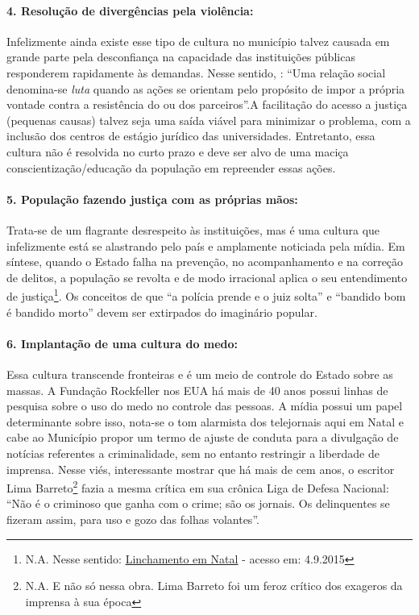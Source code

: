 \documentclass[
	12pt,				%
	openright,			%
	twoside,			%
	a4paper,			%
	chapter=TITLE,		%
	section=TITLE,		%
	subsection=TITLE,	%
	subsubsection=TITLE,%
	spanish,            %
	english,			%
	brazil				%
	]{abntex2}
\begin{document}
\paragraph*{\textbf{4. Resolução de divergências pela violência:}} Infelizmente ainda existe esse tipo de cultura no município talvez causada em grande parte pela desconfiança na capacidade das instituições públicas responderem rapidamente às demandas.  Nesse sentido, : “Uma relação social denomina-se \textit{luta} quando as ações se orientam pelo propósito de impor a própria vontade contra a resistência do ou dos parceiros”.A facilitação do acesso a justiça (pequenas causas) talvez seja uma saída viável para minimizar o problema, com a inclusão dos centros de estágio jurídico das universidades. Entretanto, essa cultura não é resolvida no curto prazo e deve ser alvo de uma maciça conscientização/educação da população em repreender essas ações.
\hypertarget{T5}{}
\paragraph*{\textbf{5. População fazendo justiça com as próprias mãos:}} Trata-se de um flagrante desrespeito às instituições, mas é uma cultura que infelizmente está se alastrando pelo país e amplamente noticiada pela mídia. Em síntese, quando o Estado falha na prevenção, no acompanhamento e na correção de delitos, a população se revolta e de modo irracional aplica o seu entendimento de justiça\footnote{N.A. Nesse sentido: \href{http://tribunadonorte.com.br/noticia/suspeito-de-estupro-a-linchado-e-morto-por-moradores-em-felipe-camara-o/323492?utm_campaign=noticias&utm_source=20150903}{Linchamento em Natal} - acesso em: 4.9.2015}. Os conceitos de que “a polícia prende  e o juiz solta” e “bandido bom é bandido morto” devem ser extirpados do imaginário popular.
\hypertarget{T6}{}
\paragraph*{\textbf{6. Implantação de uma cultura do medo:}} Essa cultura transcende fronteiras e é um meio de controle do Estado sobre as massas. A Fundação Rockfeller nos EUA há mais de 40 anos possui linhas de pesquisa sobre o uso do medo no controle das pessoas. A mídia possui um papel determinante sobre isso, nota-se o tom alarmista dos telejornais aqui em Natal e cabe ao Município propor um termo de ajuste de conduta para a divulgação de notícias referentes a criminalidade, sem no entanto restringir a liberdade de imprensa. Nesse viés, interessante mostrar que
há mais de cem anos, o escritor Lima Barreto\footnote{N.A. E não só nessa obra. Lima Barreto foi um feroz crítico dos exageros da imprensa à sua época}  fazia a mesma crítica em sua crônica Liga de Defesa Nacional: “Não é o criminoso que ganha com o crime; são os jornais. Os delinquentes se fizeram assim, para uso e gozo das folhas volantes”.
\hypertarget{T7}{}
\end{document}
